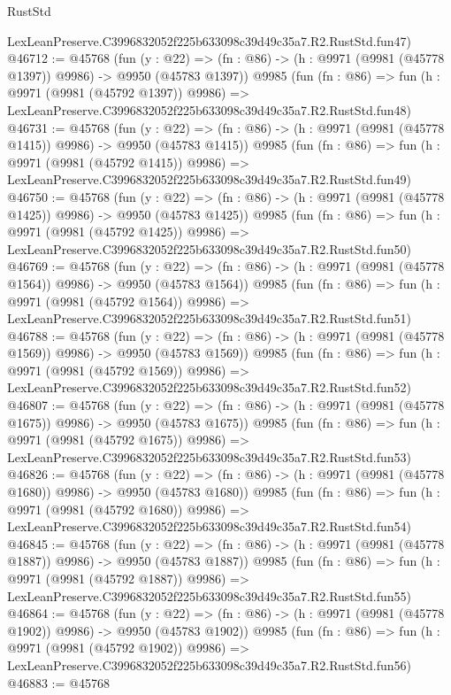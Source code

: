 \begin{lexlean}{RustStd}
\begin{coremodule}
    LexLeanPreserve.C3996832052f225b633098c39d49c35a7.R2.RustStd.fun47)
@46712 := @45768
    (fun (y : @22) =>
    (fn : @86) -> (h : @9971 (@9981 (@45778 @1397)) @9986) -> @9950 (@45783 @1397))
    @9985
    (fun (fn : @86) =>
    fun (h : @9971 (@9981 (@45792 @1397)) @9986) =>
    LexLeanPreserve.C3996832052f225b633098c39d49c35a7.R2.RustStd.fun48)
@46731 := @45768
    (fun (y : @22) =>
    (fn : @86) -> (h : @9971 (@9981 (@45778 @1415)) @9986) -> @9950 (@45783 @1415))
    @9985
    (fun (fn : @86) =>
    fun (h : @9971 (@9981 (@45792 @1415)) @9986) =>
    LexLeanPreserve.C3996832052f225b633098c39d49c35a7.R2.RustStd.fun49)
@46750 := @45768
    (fun (y : @22) =>
    (fn : @86) -> (h : @9971 (@9981 (@45778 @1425)) @9986) -> @9950 (@45783 @1425))
    @9985
    (fun (fn : @86) =>
    fun (h : @9971 (@9981 (@45792 @1425)) @9986) =>
    LexLeanPreserve.C3996832052f225b633098c39d49c35a7.R2.RustStd.fun50)
@46769 := @45768
    (fun (y : @22) =>
    (fn : @86) -> (h : @9971 (@9981 (@45778 @1564)) @9986) -> @9950 (@45783 @1564))
    @9985
    (fun (fn : @86) =>
    fun (h : @9971 (@9981 (@45792 @1564)) @9986) =>
    LexLeanPreserve.C3996832052f225b633098c39d49c35a7.R2.RustStd.fun51)
@46788 := @45768
    (fun (y : @22) =>
    (fn : @86) -> (h : @9971 (@9981 (@45778 @1569)) @9986) -> @9950 (@45783 @1569))
    @9985
    (fun (fn : @86) =>
    fun (h : @9971 (@9981 (@45792 @1569)) @9986) =>
    LexLeanPreserve.C3996832052f225b633098c39d49c35a7.R2.RustStd.fun52)
@46807 := @45768
    (fun (y : @22) =>
    (fn : @86) -> (h : @9971 (@9981 (@45778 @1675)) @9986) -> @9950 (@45783 @1675))
    @9985
    (fun (fn : @86) =>
    fun (h : @9971 (@9981 (@45792 @1675)) @9986) =>
    LexLeanPreserve.C3996832052f225b633098c39d49c35a7.R2.RustStd.fun53)
@46826 := @45768
    (fun (y : @22) =>
    (fn : @86) -> (h : @9971 (@9981 (@45778 @1680)) @9986) -> @9950 (@45783 @1680))
    @9985
    (fun (fn : @86) =>
    fun (h : @9971 (@9981 (@45792 @1680)) @9986) =>
    LexLeanPreserve.C3996832052f225b633098c39d49c35a7.R2.RustStd.fun54)
@46845 := @45768
    (fun (y : @22) =>
    (fn : @86) -> (h : @9971 (@9981 (@45778 @1887)) @9986) -> @9950 (@45783 @1887))
    @9985
    (fun (fn : @86) =>
    fun (h : @9971 (@9981 (@45792 @1887)) @9986) =>
    LexLeanPreserve.C3996832052f225b633098c39d49c35a7.R2.RustStd.fun55)
@46864 := @45768
    (fun (y : @22) =>
    (fn : @86) -> (h : @9971 (@9981 (@45778 @1902)) @9986) -> @9950 (@45783 @1902))
    @9985
    (fun (fn : @86) =>
    fun (h : @9971 (@9981 (@45792 @1902)) @9986) =>
    LexLeanPreserve.C3996832052f225b633098c39d49c35a7.R2.RustStd.fun56)
@46883 := @45768

\end{coremodule}
\end{lexlean}
